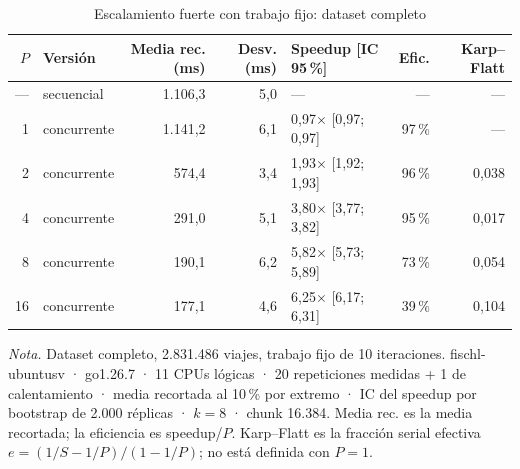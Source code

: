 \begin{table}[H]
\caption{Escalamiento fuerte con trabajo fijo: dataset completo}\label{tab:speedup-fuerte}
\footnotesize
\begin{tabular}{@{}rlrrlrr@{}}
\toprule
\textbf{$P$} & \textbf{Versión} & \textbf{Media rec. (ms)} & \textbf{Desv. (ms)} & \textbf{Speedup [IC 95\,\%]} & \textbf{Efic.} & \textbf{Karp--Flatt} \\
\midrule
--- & secuencial & 1.106,3 & 5,0 & --- & --- & --- \\
1 & concurrente & 1.141,2 & 6,1 & 0,97$\times$ [0,97; 0,97] & 97\,\% & --- \\
2 & concurrente & 574,4 & 3,4 & 1,93$\times$ [1,92; 1,93] & 96\,\% & 0,038 \\
4 & concurrente & 291,0 & 5,1 & 3,80$\times$ [3,77; 3,82] & 95\,\% & 0,017 \\
8 & concurrente & 190,1 & 6,2 & 5,82$\times$ [5,73; 5,89] & 73\,\% & 0,054 \\
16 & concurrente & 177,1 & 4,6 & 6,25$\times$ [6,17; 6,31] & 39\,\% & 0,104 \\
\bottomrule
\end{tabular}

{\footnotesize\textit{Nota.} Dataset completo, 2.831.486 viajes, trabajo fijo de 10 iteraciones. fischl-ubuntusv · go1.26.7 · 11 CPUs lógicas · 20 repeticiones medidas + 1 de calentamiento · media recortada al 10\,\% por extremo · IC del speedup por bootstrap de 2.000 réplicas · $k=8$ · chunk 16.384. Media rec. es la media recortada; la eficiencia es speedup/$P$. Karp--Flatt es la fracción serial efectiva $e = (1/S - 1/P)/(1 - 1/P)$; no está definida con $P = 1$.\par}
\end{table}
